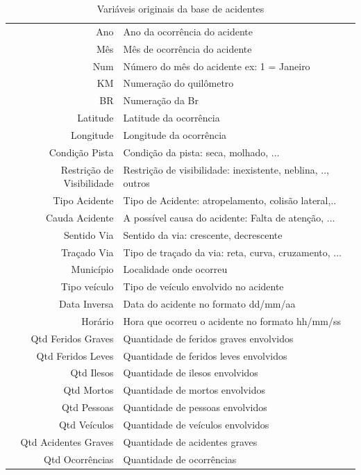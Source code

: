 \begin{table}[htbp!]
 \centering
  \caption{Variáveis originais da base de acidentes} 
  \begin{tabular}{r|l} \hline
   Ano & Ano da ocorrência do acidente\\
   Mês & Mês de ocorrência do acidente\\
   Num & Número do mês do acidente ex: 1 = Janeiro \\
   KM & Numeração do quilômetro \\
   BR & Numeração da Br\\
   Latitude & Latitude da ocorrência \\
   Longitude & Longitude da ocorrência \\
   Condição Pista & Condição da pista: seca, molhado, ... \\
   Restrição de Visibilidade & Restrição de visibilidade: inexistente, neblina, .., outros \\
   Tipo Acidente & Tipo de Acidente: atropelamento, colisão lateral,..\\
   Cauda Acidente & A possível causa do acidente: Falta de atenção, ... \\
   Sentido Via & Sentido da via: crescente, decrescente \\
   Traçado Via & Tipo de traçado da via: reta, curva, cruzamento, ... \\
   Município  & Localidade onde ocorreu \\
   Tipo veículo & Tipo de veículo envolvido no acidente \\
   Data Inversa & Data do acidente no formato dd/mm/aa \\
   Horário & Hora que ocorreu o acidente no formato hh/mm/ss \\
   Qtd Feridos Graves & Quantidade de feridos graves envolvidos \\
   Qtd Feridos Leves & Quantidade de feridos leves envolvidos\\
   Qtd Ilesos & Quantidade de ilesos envolvidos\\
   Qtd Mortos & Quantidade de mortos envolvidos \\
   Qtd Pessoas & Quantidade de pessoas envolvidos \\
   Qtd Veículos & Quantidade de veículos envolvidos\\
   Qtd Acidentes Graves & Quantidade de acidentes graves \\
   Qtd Ocorrências & Quantidade de ocorrências \\
  \end{tabular}
\end{table}

